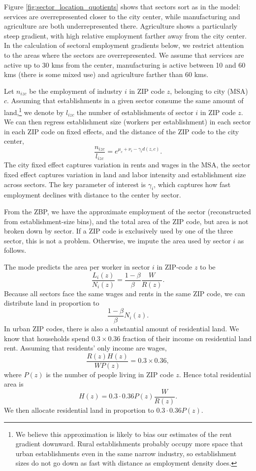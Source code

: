 \documentclass[12pt]{article}
\begin{document}
Figure \ref{fig:sector_location_quotients} shows that sectors sort as in the model: services are overrepresented closer to the city center, while manufacturing and agriculture are both underrepresented there. Agriculture shows a particularly steep gradient, with high relative employment farther away from the city center. In the calculation of sectoral employment gradients below, we restrict attention to the areas where the sectors are overrepresented. We assume that services are active up to 30 kms from the center, manufacturing is active between 10 and 60 kms (there is some mixed use) and agriculture farther than 60 kms.

Let $n_{izc}$ be the employment of industry $i$ in ZIP code $z$, belonging to city (MSA) $c$.  Assuming that establishments in a given sector consume the same amount of land,\footnote{We believe this approximation is likely to bias our estimates of the rent gradient downward. Rural establishments probably occupy more space that urban establishments even in the same narrow industry, so establishment sizes do not go down as fast with distance as employment density does. } we denote by $l_{izc}$ the number of establishments of sector $i$ in ZIP code $z$. We can then regress establishment size (workers per establishment) in each sector in each ZIP code on fixed effects, and the distance of the ZIP code to the city center,
\begin{equation}\label{eq:estimable:gradient}
\frac{n_{izc}}{l_{izc}} = e^{\mu_c+\nu_i-\gamma_i d(z,c)}.
\end{equation}
The city fixed effect captures variation in rents and wages in the MSA, the sector fixed effect captures variation in land and labor intensity and establishment size across sectors. %
The key parameter of interest is $\gamma_i$, which captures how fast employment declines with distance to the center by sector.

From the ZBP, we have the approximate employment of the sector (reconstructed from establishment-size bins), and the total area of the ZIP code, but area is not broken down by sector. If a ZIP code is exclusively used by one of the three sector, this is not a problem. Otherwise, we impute the area used by sector $i$ as follows.

The mode predicts the area per worker in sector $i$ in ZIP-code $z$ to be
\[
\frac{L_i(z)}{N_i(z)} = \frac{1-\beta}{\beta}\frac{W}{R(z)}.
\]
Because all sectors face the same wages and rents in the same ZIP code, we can distribute land in proportion to
\[
\frac{1-\beta}{\beta}N_i(z).
\]
In urban ZIP codes, there is also a substantial amount of residential land. We know that households spend $0.3\times 0.36$ fraction of their income on residential land rent. Assuming that residents' only income are wages,
\[
\frac{R(z)H(z)}{WP(z)} = 0.3\times 0.36,
\]
where $P(z)$ is the number of people living in ZIP code $z$. Hence total residential area is
\[
H(z) = 0.3\cdot0.36 P(z) \frac{W}{R(z)}.
\]
We then allocate residential land in proportion to $0.3\cdot0.36 P(z)$.
\end{document}
